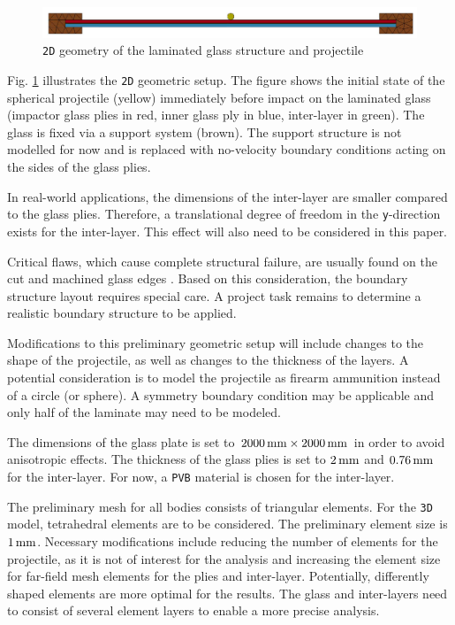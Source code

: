 \begin{figure}[h!]
    \centering
    \includegraphics[width=\columnwidth]{Geometry.png}
    \caption{\texttt{2D} geometry of the laminated glass structure and projectile \cite{Che18}}
    \label{fig:geometry}
\end{figure}

Fig. \ref{fig:geometry} illustrates the \texttt{2D} geometric setup. The figure shows the initial state of the spherical projectile (yellow) immediately before impact on the laminated glass (impactor glass plies in red, inner glass ply in blue, inter-layer in green). The glass is fixed via a support system (brown). The support structure is not modelled for now and is replaced with no-velocity boundary conditions acting on the sides of the glass plies. 

\bigbreak
In real-world applications, the dimensions of the inter-layer are smaller compared to the glass plies. Therefore, a translational degree of freedom in the \texttt{y}-direction exists for the inter-layer. This effect will also need to be considered in this paper.

\bigbreak
Critical flaws, which cause complete structural failure, are usually found on the cut and machined glass edges \cite{Pel16}. Based on this consideration, the boundary structure layout requires special care. A project task remains to determine a realistic boundary structure to be applied.

\bigbreak
Modifications to this preliminary geometric setup will include changes to the shape of the projectile, as well as changes to the thickness of the layers. A potential consideration is to model the projectile as firearm ammunition instead of a circle (or sphere). A symmetry boundary condition may be applicable and only half of the laminate may need to be modeled.

\bigbreak
The dimensions of the glass plate is set to $2000\,{\rm{mm}}\times2000\,{\rm{mm}}$ in order to avoid anisotropic effects. The thickness of the glass plies is set to $2\,{\rm{mm}}$ and $0.76\,{\rm{mm}}$ for the inter-layer. For now, a \texttt{PVB} material is chosen for the inter-layer.

\bigbreak
The preliminary mesh for all bodies consists of triangular elements. For the \texttt{3D} model, tetrahedral elements \cite{Che18} are to be considered. The preliminary element size is $1\,{\rm{mm}}$. Necessary modifications include reducing the number of elements for the projectile, as it is not of interest for the analysis and increasing the element size for far-field mesh elements for the plies and inter-layer. Potentially, differently shaped elements are more optimal for the results. The glass and inter-layers need to consist of several element layers to enable a more precise analysis. 

